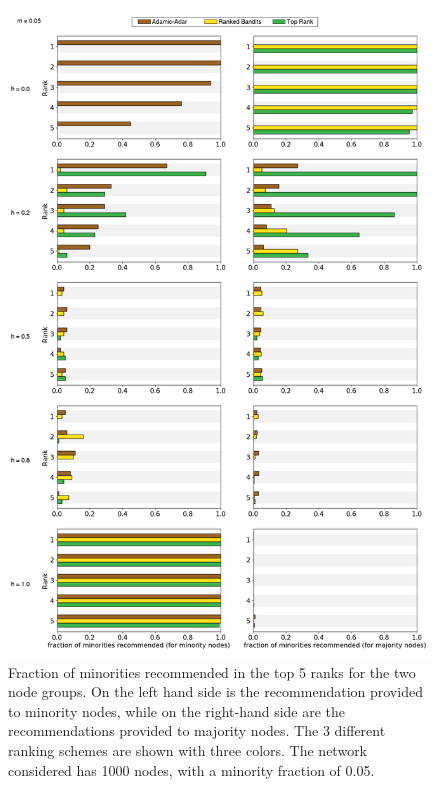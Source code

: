 \begin{figure}
	\includegraphics[scale=0.28]{images/proposal_figure_3_1}
	\caption{Fraction of minorities recommended in the top 5 ranks for the two node groups. On the left hand side is the recommendation provided to minority nodes, while on the right-hand side are the recommendations provided to majority nodes. The 3 different ranking schemes are shown with three colors. The network considered has 1000 nodes, with a minority fraction of 0.05.}
	\label{fig-rank_1}
\end{figure}

